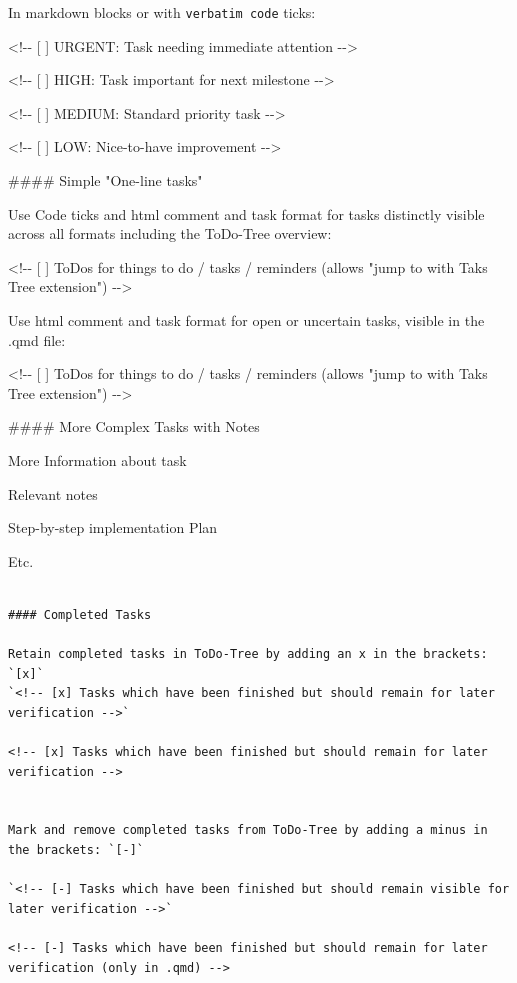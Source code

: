 \documentclass[
  11pt,
  letterpaper,
]{book}
\newenvironment{Shaded}{\begin{snugshade}}{\end{snugshade}}
\newcommand{\CommentTok}[1]{\textcolor[rgb]{0.37,0.37,0.37}{#1}}
\newcommand{\FunctionTok}[1]{\textcolor[rgb]{0.28,0.35,0.67}{#1}}
\newcommand{\InformationTok}[1]{\textcolor[rgb]{0.37,0.37,0.37}{#1}}
\newcommand{\NormalTok}[1]{\textcolor[rgb]{0.00,0.23,0.31}{#1}}
\begin{document}
In markdown blocks or with \texttt{verbatim\ code} ticks:

\begin{Shaded}
\begin{Highlighting}[]
\CommentTok{\textless{}!{-}{-} [ ] URGENT: Task needing immediate attention {-}{-}\textgreater{}}

\CommentTok{\textless{}!{-}{-} [ ] HIGH: Task important for next milestone {-}{-}\textgreater{}}

\CommentTok{\textless{}!{-}{-} [ ] MEDIUM: Standard priority task {-}{-}\textgreater{}}

\CommentTok{\textless{}!{-}{-} [ ] LOW: Nice{-}to{-}have improvement {-}{-}\textgreater{}}
\end{Highlighting}
\end{Shaded}

\begin{Shaded}
\begin{Highlighting}[]
\FunctionTok{\#\#\#\# Simple "One{-}line tasks"}

\NormalTok{Use Code ticks and html comment and task format for tasks distinctly visible across all formats including the ToDo{-}Tree overview:}

\InformationTok{\textasciigrave{}\textless{}!{-}{-} [ ] ToDos for things to do / tasks / reminders (allows "jump to with Taks Tree extension") {-}{-}\textgreater{}\textasciigrave{}}

\NormalTok{Use html comment and task format for open or uncertain tasks, visible in the .qmd file:}

\CommentTok{\textless{}!{-}{-} [ ] ToDos for things to do / tasks / reminders (allows "jump to with Taks Tree extension") {-}{-}\textgreater{}}



\FunctionTok{\#\#\#\# More Complex Tasks with Notes}
\end{Highlighting}
\end{Shaded}

More Information about task

Relevant notes

Step-by-step implementation Plan

Etc.

\begin{verbatim}

#### Completed Tasks

Retain completed tasks in ToDo-Tree by adding an x in the brackets: `[x]`
`<!-- [x] Tasks which have been finished but should remain for later verification -->`

<!-- [x] Tasks which have been finished but should remain for later verification -->


Mark and remove completed tasks from ToDo-Tree by adding a minus in the brackets: `[-]`

`<!-- [-] Tasks which have been finished but should remain visible for later verification -->`

<!-- [-] Tasks which have been finished but should remain for later verification (only in .qmd) -->
\end{verbatim}
\end{document}
